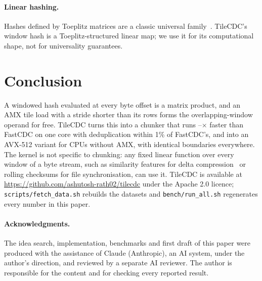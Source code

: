 \documentclass[10pt,twocolumn]{article}
\begin{document}
\paragraph{Linear hashing.} Hashes defined by Toeplitz matrices are a classic universal family~\cite{mansour,krawczyk}. TileCDC's window hash is a Toeplitz-structured linear map; we use it for its computational shape, not for universality guarantees.

\section{Conclusion}
A windowed hash evaluated at every byte offset is a matrix product, and an AMX tile load with a stride shorter than its rows forms the overlapping-window operand for free. TileCDC turns this into a chunker that runs \spMin--\spMax$\times$ faster than FastCDC on one core with deduplication within 1\% of FastCDC's, and into an AVX-512 variant for CPUs without AMX, with identical boundaries everywhere. The kernel is not specific to chunking: any fixed linear function over every window of a byte stream, such as similarity features for delta compression~\cite{finesse} or rolling checksums for file synchronisation, can use it. TileCDC is available at \url{https://github.com/ashutosh-rath02/tilecdc} under the Apache 2.0 licence; \texttt{scripts/fetch\_data.sh} rebuilds the datasets and \texttt{bench/run\_all.sh} regenerates every number in this paper.

\paragraph{Acknowledgments.} The idea search, implementation, benchmarks and first draft of this paper were produced with the assistance of Claude (Anthropic), an AI system, under the author's direction, and reviewed by a separate AI reviewer. The author is responsible for the content and for checking every reported result.
\end{document}
